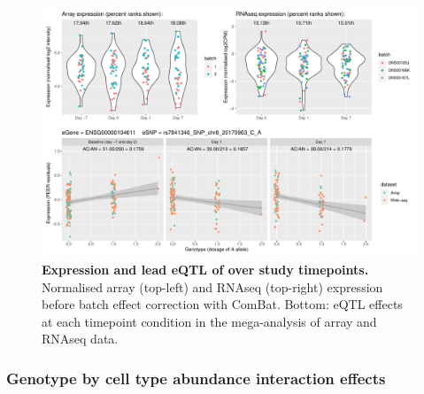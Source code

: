 \begin{figure}
    \centering
    \includegraphics[width=1.0\textwidth,page=1]{mainmatter/figures/chapter_03/plot_dge_eqtl_genotypes.ENSG00000104611,rs7841346_SNP_chr8_20170963_C_A.pdf}
    \caption[
    ]{
        \textbf{Expression and lead \gls{eQTL} of  over study timepoints.}
        Normalised array (top-left) and \gls{RNAseq} (top-right) expression before batch effect correction with ComBat.
        Bottom: \gls{eQTL} effects at each timepoint condition in the mega-analysis of array and \gls{RNAseq} data.
    }
    \label{fig:hird_reQTL_ploteQTL_SH2D4A}
\end{figure}

\subsubsection{Genotype by cell type abundance interaction effects}

